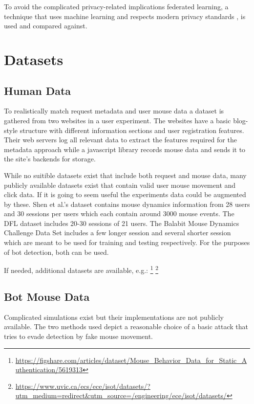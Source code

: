 \documentclass[
    fontsize=12pt,
    headings=small,
    parskip=half,           %
    bibliography=totoc,
    numbers=noenddot,       %
    open=any,               %
    final                   %
]{scrreprt}
\begin{document}
To avoid the complicated privacy-related implications federated learning, a technique that uses machine learning and respects modern privacy standards \cite{DBLP:journals/corr/KonecnyMR15} \cite{DBLP:journals/corr/KonecnyMRR16}, is used and compared against.


\section{Datasets}

\subsection{Human Data}

To realistically match request metadata and user mouse data a dataset is gathered from two websites in a user experiment. The websites have a basic blog-style structure with different information sections and user registration features. Their web servers log all relevant data to extract the features required for the metadata approach while a javascript library records mouse data and sends it to the site's backends for storage.

While no suitible datasets exist that include both request and mouse data, many publicly available datasets exist that contain valid user mouse movement and click data. If it is going to seem useful the experiments data could be augmented by these.
Shen et al.'s \cite{6263955} dataset contains mouse dynamics information from 28 users and 30 sessions per users which each contain around 3000 mouse events.
The DFL dataset \cite{9111596} includes 20-30 sessions of 21 users.
The Balabit Mouse Dynamics Challenge Data Set \cite{BALABIT_CHALLENGE} includes a few longer session and several shorter session which are meant to be used for training and testing respectively. For the purposes of bot detection, both can be used.

If needed, additional datasets are available, e.g.:
\footnote{\url{https://figshare.com/articles/dataset/Mouse_Behavior_Data_for_Static_Authentication/5619313}}
\footnote{\url{https://www.uvic.ca/ecs/ece/isot/datasets/?utm_medium=redirect&utm_source=/engineering/ece/isot/datasets/}}

\subsection{Bot Mouse Data}

Complicated simulations exist but their implementations are not publicly available. \cite{8275816} \cite{Nazar2003} The two methods used depict a reasonable choice of a basic attack that tries to evade detection by fake mouse movement. 
\end{document}
